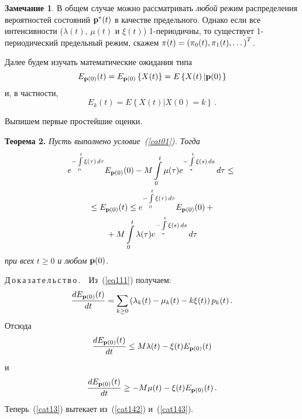 \begin{multicols}{2}
\smallskip

\noindent
\textbf{Замечание 1}. 
В общем случае можно рассматривать  {\it любой} режим распределения вероятностей состояний ${\bf p^*}(t)$ в качестве предельного.
Однако если все интенсивности ($\lambda(t)$, $\mu(t)$ и $\xi(t)$)
1-периодичны, то существует  1-периодический предельный режим,
скажем ${\bf \pi}(t) = \left(\pi_0(t),\pi_1(t),\dots\right)^T$.


\smallskip


Далее будем изучать математические ожидания типа
\begin{equation*}
E_{{\mathbf p}(0)}(t) =  E_{{\mathbf p}(0)}\left\{X(t)\right\} =
E\left\{X(t)\left|{{\mathbf p}(0)}\right. \right\} 
\end{equation*} 
и, в частности, 
\begin{equation*} 
E_k(t) = E\left\{X(t)\left|X(0)=k\right.\right\}\,.
\end{equation*}

\medskip

Выпишем первые простейшие оценки.

\smallskip

\noindent
\textbf{Теорема 2.} \label{mean01}
\textit{Пусть выполнено условие~{\rm (\ref{cat01})}. Тогда}
\begin{multline}
e^{-\int\limits_0^t \xi(\tau)\, d\tau}E_{{\mathbf p}(0)}(0) - M
\int\limits_0^t \mu(\tau)
e^{-\int\limits_{\tau}^t \xi(s)\, ds} \, d\tau \le {} \\
{}\le E_{{\mathbf p}(0)}(t) \le e^{-\int\limits_0^t \xi(\tau)\,
d\tau}E_{{\mathbf p}(0)}(0) +{}\\
{}+
 M\int\limits_0^t \lambda(\tau)
e^{-\int\limits_{\tau}^t \xi(s)\, ds} \, d\tau 
\label{cat13}
\end{multline}
\textit{при всех} $t \ge 0$ \textit{и любом} ${\mathbf p}(0)$.

\smallskip

\noindent
Д\,о\,к\,а\,з\,а\,т\,е\,л\,ь\,с\,т\,в\,о\,.\ \, Из~(\ref{eq111}) получаем:
\begin{equation*}
\displaystyle\frac{\displaystyle d E_{{\mathbf p}(0)}(t)\mathstrut}{\displaystyle dt\mathstrut} =  \sum_{k \ge
0}\left(\lambda_k(t)-\mu_k(t)-k\xi(t)\right) p_k(t)\,. 
\end{equation*}
Отсюда
\begin{equation}
\displaystyle\frac{\displaystyle d E_{{\mathbf p}(0)}(t)\mathstrut}{\displaystyle dt\mathstrut} \le  M\lambda(t)  - \xi(t) E_{{\mathbf p}(0)}(t)
 \label{cat142}
\end{equation}
и
\begin{equation}
\displaystyle\frac{\displaystyle d E_{{\mathbf p}(0)}(t)\mathstrut}{\displaystyle dt\mathstrut} \ge  - M\mu (t) - \xi(t) E_{{\mathbf p}(0)}(t) \,.
\label{cat143}
\end{equation}
Теперь~(\ref{cat13}) вытекает из~(\ref{cat142}) и~(\ref{cat143}).


\end{multicols}
